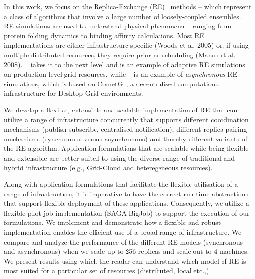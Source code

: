 \documentclass{rspublic}
\begin{document}
In this work, we focus on the Replica-Exchange
(RE)~\citep{hansmann,Sugita:1999rm} methods -- which represent a class
of algorithms that involve a large number of loosely-coupled
ensembles.  RE simulations are used to understand physical phenomena
-- ranging from protein folding dynamics to binding affinity
calculations. Most RE implementations are either infrastructure
specific (Woods et al. 2005) or, if using multiple distributed
resources, they require prior co-scheduling (Manos et
al. 2008). ~\citep{Luckow:2008fp} takes it to the next level and is an
example of adaptive RE simulations on production-level grid resources,
while ~\citep{parashar_arepex} is an example of \emph{asynchronous} RE
simulations, which is based on
CometG~\citep{Li:2005:CSC:1090948.1091381}, a decentralised
computational infrastructure for Desktop Grid environments.

We develop a flexible, extensible and scalable implementation of RE
that can utilize a range of infrastructure concurrently that supports
different coordination mechanisms (publish-subscribe, centralised
notification), different replica pairing mechanisms (synchronous
versus asynchronous) and thereby different variants of the RE
algorithm.  Application formulations that are scalable while being
flexible and extensible are better suited to using the diverse range
of traditional and hybrid infrastructure (e.g., Grid-Cloud and
heteregeneous resources).  

Along with application formulations that facilitate the flexible
utilisation of a range of infrastructure, it is imperative to have the
correct run-time abstractions that support flexible deployment of
these applications.  Consequently, we utilize a flexible pilot-job
implementation (SAGA BigJob) to support the execution of our
formulations.  We implement and demonstrate how a flexible and robust
implementation enables the efficient use of a broad range of
infrastructure. We compare and analyze the performance of the
different RE models (synchronous and asynchronous) when we scale-up to
256 replicas and scale-out to 4 machines. We present results using
which the reader can understand which model of RE is most suited for a
particular set of resources (distributed, local etc.,)
\end{document}
